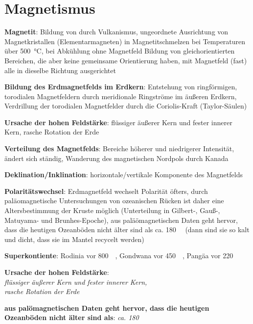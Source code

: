 \section{%
    Magnetismus%
}

\textbf{Magnetit}:
Bildung von  durch Vulkanismus,
ungeordnete Ausrichtung von Magnetkristallen (Elementarmagneten) in Magnetitschmelzen bei
Temperaturen über \SI{500}{\celsius},
bei Abkühlung ohne Magnetfeld Bildung von gleichorientierten Bereichen, die aber keine
gemeinsame Orientierung haben,
mit Magnetfeld (fast) alle in dieselbe Richtung ausgerichtet

\textbf{Bildung des Erdmagnetfelds im Erdkern}:
Entstehung von ringförmigen, torodialen Magnetfeldern durch meridionale Ringströme im
äußeren Erdkern,
Verdrillung der torodialen Magnetfelder durch die Coriolis-Kraft (Taylor-Säulen)

\textbf{Ursache der hohen Feldstärke}:
flüssiger äußerer Kern und fester innerer Kern,
rasche Rotation der Erde

\textbf{Verteilung des Magnetfelds}:
Bereiche höherer und niedrigerer Intensität,
ändert sich ständig,
Wanderung des magnetischen Nordpols durch Kanada

\textbf{Deklination/Inklination}:
horizontale/vertikale Komponente des Magnetfelds

\textbf{Polaritätswechsel}:
Erdmagnetfeld wechselt Polarität öfters,
durch paläomagnetische Untersuchungen von ozeanischen Rücken ist daher eine
Altersbestimmung der Kruste möglich
(Unterteilung in Gilbert-, Gauß-, Matuyama- und Brunhes-Epoche),
aus paläömagnetischen Daten geht hervor, dass die heutigen Ozeanböden nicht älter sind als
ca. \SI{180}{\mega\year}
(dann sind sie so kalt und dicht, dass sie im Mantel recycelt werden)

\textbf{Superkontiente}:
Rodinia vor \SI{800}{\mega\year},
Gondwana vor \SI{450}{\mega\year},
Pangäa vor \SI{220}{\mega\year}

\begin{wichtig}
    \item
    \textbf{Ursache der hohen Feldstärke}:\\
    \emph{flüssiger äußerer Kern und fester innerer Kern,\\
    rasche Rotation der Erde}

    \item
    \textbf{aus palömagnetischen Daten geht hervor, dass die heutigen Ozeanböden nicht
    älter sind als}:
    \emph{ca. \SI[math-rm=\mathit,text-rm=\itshape]{180}{\mega\year}}
\end{wichtig}

